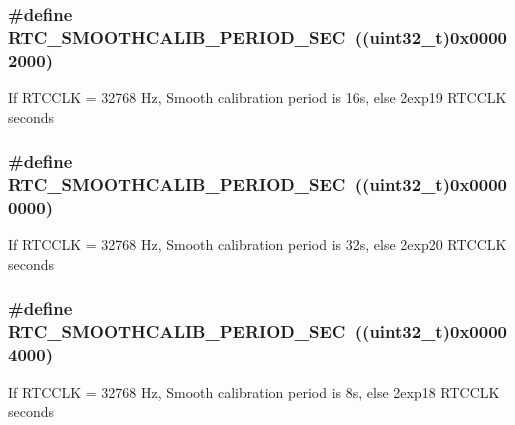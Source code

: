 \subsubsection[{\texorpdfstring{R\+T\+C\+\_\+\+S\+M\+O\+O\+T\+H\+C\+A\+L\+I\+B\+\_\+\+P\+E\+R\+I\+O\+D\+\_\+16\+S\+EC}{RTC_SMOOTHCALIB_PERIOD_16SEC}}]{\setlength{\rightskip}{0pt plus 5cm}\#define R\+T\+C\+\_\+\+S\+M\+O\+O\+T\+H\+C\+A\+L\+I\+B\+\_\+\+P\+E\+R\+I\+O\+D\+\_\+S\+EC~((uint32\+\_\+t)0x00002000)}\hypertarget{group___r_t_c_ex___smooth__calib__period___definitions_ga0c192bdebd2496f60b8a4aa7db499262}{}\label{group___r_t_c_ex___smooth__calib__period___definitions_ga0c192bdebd2496f60b8a4aa7db499262}
If R\+T\+C\+C\+LK = 32768 Hz, Smooth calibration period is 16s, else 2exp19 R\+T\+C\+C\+LK seconds 
\subsubsection[{\texorpdfstring{R\+T\+C\+\_\+\+S\+M\+O\+O\+T\+H\+C\+A\+L\+I\+B\+\_\+\+P\+E\+R\+I\+O\+D\+\_\+32\+S\+EC}{RTC_SMOOTHCALIB_PERIOD_32SEC}}]{\setlength{\rightskip}{0pt plus 5cm}\#define R\+T\+C\+\_\+\+S\+M\+O\+O\+T\+H\+C\+A\+L\+I\+B\+\_\+\+P\+E\+R\+I\+O\+D\+\_\+S\+EC~((uint32\+\_\+t)0x00000000)}\hypertarget{group___r_t_c_ex___smooth__calib__period___definitions_gaab8a844313898595cd72f86570198e5a}{}\label{group___r_t_c_ex___smooth__calib__period___definitions_gaab8a844313898595cd72f86570198e5a}
If R\+T\+C\+C\+LK = 32768 Hz, Smooth calibration period is 32s, else 2exp20 R\+T\+C\+C\+LK seconds 
\subsubsection[{\texorpdfstring{R\+T\+C\+\_\+\+S\+M\+O\+O\+T\+H\+C\+A\+L\+I\+B\+\_\+\+P\+E\+R\+I\+O\+D\+\_\+8\+S\+EC}{RTC_SMOOTHCALIB_PERIOD_8SEC}}]{\setlength{\rightskip}{0pt plus 5cm}\#define R\+T\+C\+\_\+\+S\+M\+O\+O\+T\+H\+C\+A\+L\+I\+B\+\_\+\+P\+E\+R\+I\+O\+D\+\_\+S\+EC~((uint32\+\_\+t)0x00004000)}\hypertarget{group___r_t_c_ex___smooth__calib__period___definitions_ga0993db27ee5b25c8db41c8e58b478ffe}{}\label{group___r_t_c_ex___smooth__calib__period___definitions_ga0993db27ee5b25c8db41c8e58b478ffe}
If R\+T\+C\+C\+LK = 32768 Hz, Smooth calibration period is 8s, else 2exp18 R\+T\+C\+C\+LK seconds 